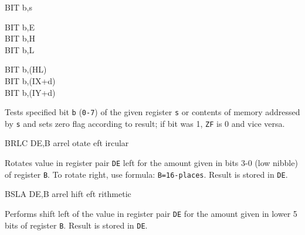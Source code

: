 \documentclass[12pt,twoside,openright,a4paper]{book}
\begin{document}
\begin{basedescript}{
	\desclabelstyle{\multilinelabel}
	\desclabelwidth{3cm}}
\begin{DetailItem}{BIT b,s}
\begin{DetailVariants}
			\columnbreak
			BIT b,E\\
			BIT b,H\\
			BIT b,L
			
			\columnbreak
			BIT b,(HL)\\
			BIT b,(IX+d)\\
			BIT b,(IY+d)
		\end{DetailVariants}

		Tests specified bit {\tt b} ({\tt 0-7}) of the given register {\tt s} or contents of memory addressed by {\tt s} and sets zero flag according to result; if bit was 1, {\tt ZF} is 0 and vice versa.

		\begin{DetailEffects}
			\FlagsBITr
		\end{DetailEffects}

		\begin{DetailTiming}
			\DetailTime[b,r]{2}{8}
			\DetailTime[b,(HL)]{3}{12}
			\DetailTime[b,(IX+d)]{5}{20}
			\DetailTime[b,(IY+d)]{5}{20}
		\end{DetailTiming}

	\end{DetailItem}

	\begin{DetailItem}{BRLC DE,B\ZXN}
		{arrel otate eft ircular}
		{\SymBRLC}

		Rotates value in register pair {\tt DE} left for the amount given in bits 3-0 (low nibble) of register {\tt B}. To rotate right, use formula: {\tt B=16-places}. Result is stored in {\tt DE}.

		\begin{DetailEffects}
			\FlagsBRLC
		\end{DetailEffects}

		\begin{DetailTiming}
			\DetailTime{2}{8}
		\end{DetailTiming}

	\end{DetailItem}

	\begin{DetailItem}{BSLA DE,B\ZXN}
		{arrel hift eft rithmetic}
		{\SymBSLA}

		Performs shift left of the value in register pair {\tt DE} for the amount given in lower 5 bits of register {\tt B}. Result is stored in {\tt DE}.

		\begin{DetailEffects}
			\FlagsBSLA
		\end{DetailEffects}
		

\end{DetailItem}
\end{basedescript}
\end{document}
